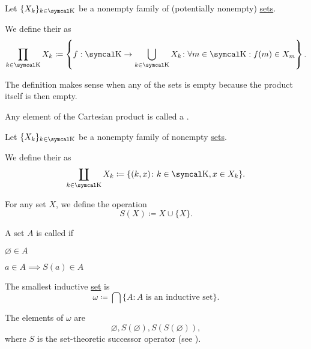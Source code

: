 \begin{definition}\label{def:cartesian_product}
  Let \( \{ X_k \}_{k \in \CK} \) be a nonempty family of (potentially nonempty) \hyperref[def:indexed_family]{sets}.

  We define their  as
  \begin{equation*}
    \prod_{k \in \CK} X_k \coloneqq \left\{ f: \CK \to \bigcup_{k \in \CK} X_k \colon \forall m \in \CK: f(m) \in X_m \right\}.
  \end{equation*}

  The definition makes sense when any of the sets is empty because the product itself is then empty.

  Any element of the Cartesian product is called a .
\end{definition}

\begin{definition}\label{def:disjoint_union}
  Let \( \{ X_k \}_{k \in \CK} \) be a nonempty family of nonempty \hyperref[def:indexed_family]{sets}.

  We define their  as
  \begin{equation*}
    \coprod_{k \in \CK} X_k \coloneqq \{ (k, x) \colon k \in \CK, x \in X_k \}.
  \end{equation*}
\end{definition}

\begin{definition}\label{def:successor_operator}
  For any set \( X \), we define the  operation
  \begin{equation*}
    S(X) \coloneqq X \cup \{ X \}.
  \end{equation*}
\end{definition}

\begin{definition}\label{def:inductive_set}
  A set \( A \) is called  if
  \begin{DefEnum}
    \item \( \varnothing \in A \)
    \item \( a \in A \implies S(a) \in A \)
  \end{DefEnum}
\end{definition}

\begin{definition}\label{def:smallest_inductive_set}
  The smallest inductive \hyperref[def:inductive_set]{set} is
  \begin{equation*}
    \omega \coloneqq \bigcap \{ A \colon A \text{ is an inductive set} \}.
  \end{equation*}

  The elements of \( \omega \) are
  \begin{equation*}
    \varnothing, S(\varnothing), S(S(\varnothing)),
  \end{equation*}
  where \( S \) is the set-theoretic successor operator (see ).
\end{definition}

